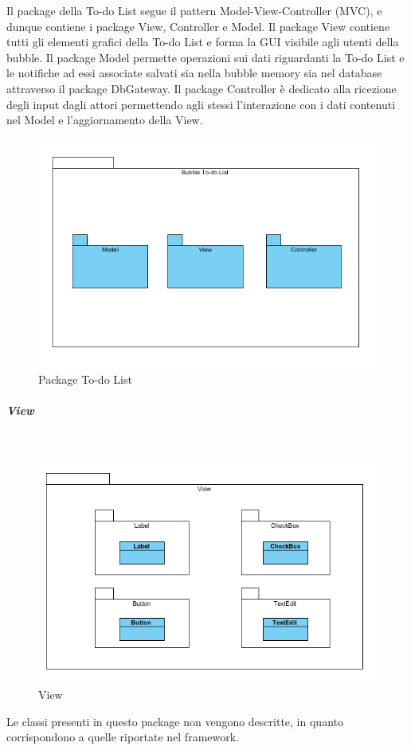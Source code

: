 Il package della To-do List segue il pattern Model-View-Controller (MVC), e dunque contiene i package View, Controller e Model. Il package View contiene tutti gli elementi grafici della To-do List e forma la GUI visibile agli utenti della bubble. Il package Model permette operazioni sui dati riguardanti la To-do List e le notifiche ad essi associate salvati sia nella bubble memory sia nel database attraverso il package Db\-Gateway. Il package Controller è dedicato alla ricezione degli input dagli attori permettendo agli stessi l'interazione con i dati contenuti nel Model e l'aggiornamento della View.

\begin{figure}[H]
	\centering
	\includegraphics[width=14cm]{../../documenti/SpecificaTecnica/diagrammi_img/classi_e_package/todo.png}
	\caption{Package To-do List}
\end{figure}

\begin{samepage}
\subparagraph{View}\mbox{}\\
\nopagebreak
\begin{figure}[H]
	\centering
	\includegraphics[width=14cm]{../../documenti/SpecificaTecnica/diagrammi_img/classi_e_package/todo_view.png}
	\caption{View}
\end{figure}
\end{samepage}
Le classi presenti in questo package non vengono descritte, in quanto corrispondono a quelle riportate nel framework.

